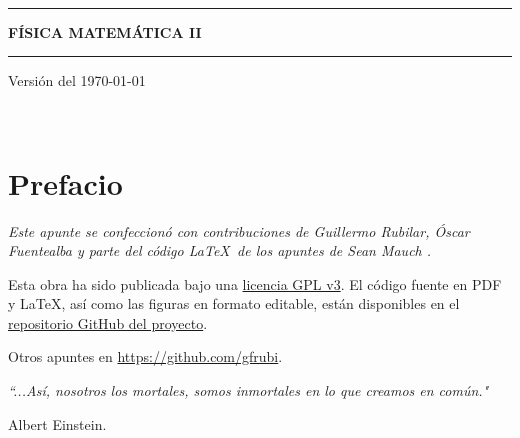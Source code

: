 \documentclass[letterpaper,11pt]{report}
\begin{document}
\sffamily

\thispagestyle{empty}
\begin{center}

\ 

\vspace{6.5cm}

\rule{15cm}{0.1cm}

\vspace{1.5cm}

{\huge \textsc{\textbf{FÍSICA MATEMÁTICA II}}}

\vspace{1.5cm}

\rule{15cm}{0.1cm}

\vspace{1.5cm}

Versión del \today

\end{center}


\newpage
\thispagestyle{empty}
\ \\
\newpage
\setcounter{page}{1}

\pagestyle{plain}
\chapter*{Prefacio}
\bigskip
\bigskip
\bigskip
\bigskip
\bigskip
\bigskip



\bigskip\emph{Este apunte se confeccionó con contribuciones de Guillermo Rubilar, Óscar Fuentealba y parte del código \LaTeX\, de los apuntes de Sean Mauch \cite{Mauch}.} 

\bigskip
\bigskip
\bigskip
\bigskip
\bigskip



Esta obra ha sido publicada bajo una \href{https://github.com/gfrubi/FM2/blob/master/LICENSE}{licencia GPL v3}. El código fuente en PDF y \LaTeX, así como las figuras en formato editable, están disponibles en el \href{https://github.com/gfrubi/FM2}{repositorio GitHub del proyecto}.

\bigskip
\bigskip
\bigskip
\bigskip
\bigskip
\bigskip

Otros apuntes en \url{https://github.com/gfrubi}.

\bigskip
\bigskip
\bigskip
\bigskip
\bigskip
\bigskip





\emph{\textquotedblleft ...Así, nosotros los mortales, somos
inmortales en lo que creamos en común."}

\begin{flushright}
Albert Einstein.
\end{flushright}
\newpage

\tableofcontents
{}
\setcounter{page}{1}








\appendix





\end{document}
